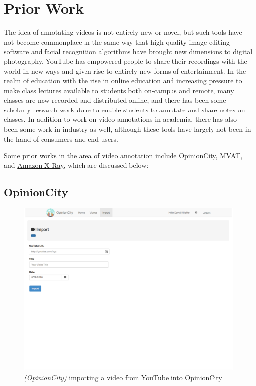 %
\chapter{Prior Work}
\label{sec:priorwork}


The idea of annotating videos is not entirely new or novel, but such tools have not become commonplace in the same way that high quality image editing software and facial recognition algorithms have brought new dimensions to digital photography.  YouTube has empowered people to share their recordings with the world in new ways and given rise to entirely new forms of entertainment.  In the realm of education with the rise in online education and increasing pressure to make class lectures available to students both on-campus and remote, many classes are now recorded and distributed online, and there has been some scholarly research work done to enable students to annotate and share notes on classes.  In addition to work on video annotations in academia, there has also been some work in industry as well, although these tools have largely not been in the hand of consumers and end-users.

Some prior works in the area of video annotation include \hyperref[sec:priorwork:opinioncity]{OpinionCity}, \hyperref[sec:priorwork:media-rich-video-annotation-tool]{MVAT}, and \hyperref[sec:priorwork:amazon-x-ray]{Amazon X-Ray}, which are discussed below:



\section{OpinionCity}
\label{sec:priorwork:opinioncity}

\begin{figure}[!ht]
	\includegraphics[width=\textwidth]{gfx/opinion-city/import2.pdf}
	\caption{\textit{(OpinionCity)} importing a video from \href{http://www.youtube.com}{YouTube} into OpinionCity} 
	\label{fig:opinioncity:importing-a-video-from-youtube}
\end{figure}


